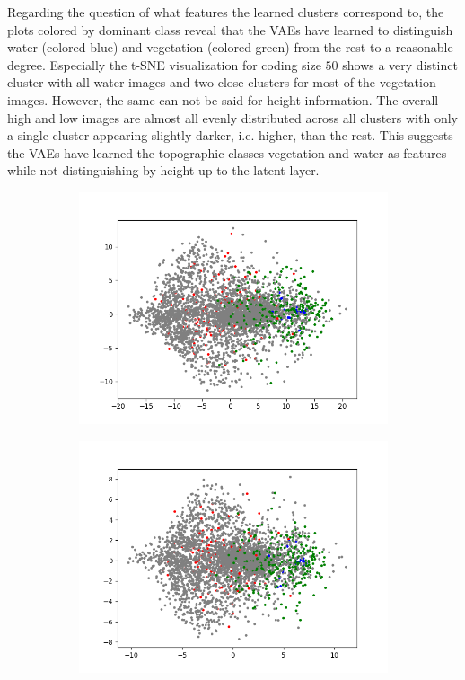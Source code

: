 Regarding the question of what features the learned clusters correspond to, the plots colored by dominant class
reveal that the VAEs have learned to distinguish water (colored blue) and vegetation (colored green) from the rest 
to a reasonable degree. Especially the t-SNE visualization for coding size $50$ shows a very distinct cluster
with all water images and two close clusters for most of the vegetation images.
However, the same can not be said for height information. The overall high and low images are almost all 
evenly distributed across all clusters with only a single cluster appearing slightly darker, i.e. higher, than the
rest. This suggests the VAEs have learned the topographic classes vegetation and water as features while not 
distinguishing by height up to the latent layer. 


\begin{figure}[H]
    \centering
    \begin{subfigure}{.25\textwidth}
        \centering
        \includegraphics[width=\textwidth]{images/figures/experiments_latent/convolutional_dim1024_PCA_classes.png}
    \end{subfigure}%
    \begin{subfigure}{.25\textwidth}
        \centering
        \includegraphics[width=\textwidth]{images/figures/experiments_latent/convolutional_dim512_PCA_classes.png}

\end{subfigure}
\end{figure}
